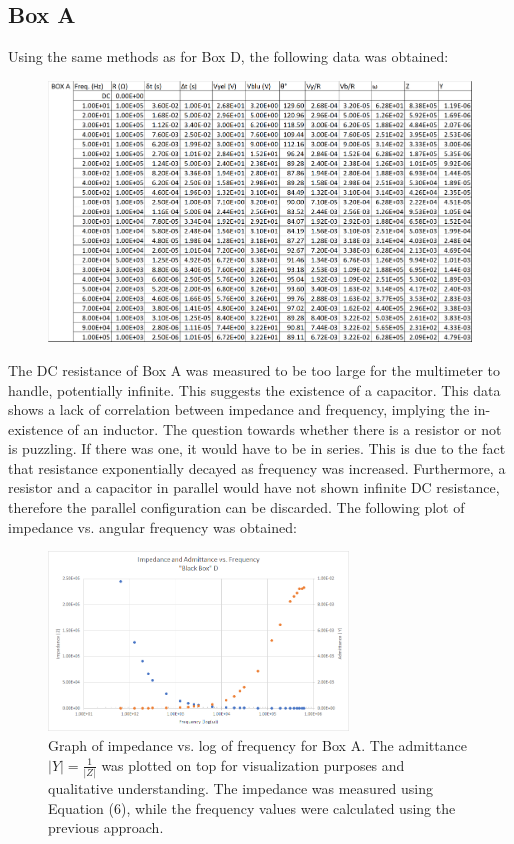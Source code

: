 \documentclass[a4paper]{article}
\begin{document}
\subsection{Box A}
Using the same methods as for Box D, the following data was obtained:
\begin{figure}[h]
\centering
\includegraphics[width=1.0\textwidth]{boxa}
\end{figure}

The DC resistance of Box A was measured to be too large for the multimeter to handle, potentially infinite. This suggests the existence of a capacitor. This data shows a lack of correlation between impedance and frequency, implying the in-existence of an inductor. The question towards whether there is a resistor or not is puzzling. If there was one, it would have to be in series. This is due to the fact that resistance exponentially decayed as frequency was increased. Furthermore, a resistor and a capacitor in parallel would have not shown infinite DC resistance, therefore the parallel configuration can be discarded. The following plot of impedance vs. angular frequency was obtained:
\begin{figure}[h]
\centering
\includegraphics[width=0.71\textwidth]{boxdplot}
\caption{Graph of impedance vs. log of frequency for Box A. The admittance $|Y|=\frac{1}{|Z|}$ was plotted on top for visualization purposes and qualitative understanding. The impedance was measured using Equation (6), while the frequency values were calculated using the previous approach. }
\end{figure}
\end{document}
